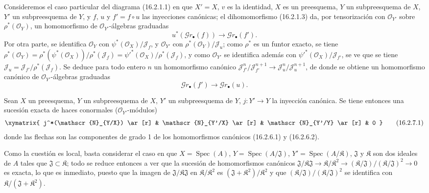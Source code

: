 \begin{env}[16.2.6]
\label{IV.16.2.6}
Consideremos el caso particular del diagrama (16.2.1.1) en que $X'=X$, $v$ es
la identidad, $X$ es un preesquema, $Y$ un subpreesquema de $X$, $Y'$ un
subpreesquema de $Y$, y $f$, $u$ y $f'=f\circ u$ las inyecciones canónicas; el
dihomomorfismo (16.2.1.3) da, por tensorización con
$\mathcal{O}_{Y'}$ sobre $\rho^*(\mathcal{O}_Y)$, un homomorfismo de
$\mathcal{O}_{Y'}$-álgebras graduadas
\[
  u^*(\mathscr{G}r_\bullet(f))
  \longrightarrow\mathscr{G}r_\bullet(f').
  \tag{16.2.6.1}
  \label{IV.16.2.6.1}
\]
Por otra parte, se identifica $\mathcal{O}_Y$ con
$\psi^*(\mathcal{O}_X)/\mathscr{J}_f$, y $\mathcal{O}_{Y'}$ con
$\rho^*(\mathcal{O}_Y)/\mathscr{J}_u$; como $\rho^*$ es un funtor exacto,
se tiene
$\rho^*(\mathcal{O}_Y)=
\rho^*(\psi^*(\mathcal{O}_X))/\rho^*(\mathscr{J}_f)=
\psi'^*(\mathcal{O}_X)/\rho^*(\mathscr{J}_f)$, y como
$\mathcal{O}_{Y'}$ se identifica además con
$\psi'^*(\mathcal{O}_X)/\mathscr{J}_{f'}$, se ve que se tiene
$\mathscr{J}_u=\mathscr{J}_{f'}/\rho^*(\mathscr{J}_f)$. Se deduce para
todo entero $n$ un homomorfismo canónico
$\mathscr{J}_{f'}^n/\mathscr{J}_{f'}^{n+1}\to
\mathscr{J}_u^n/\mathscr{J}_u^{n+1}$, de donde se obtiene un homomorfismo canónico de
$\mathcal{O}_{Y'}$-álgebras graduadas
\[
  \mathscr{G}r_\bullet(f')
  \longrightarrow\mathscr{G}r_\bullet(u).
  \tag{16.2.6.2}
  \label{IV.16.2.6.2}
\]
\end{env}

\begin{proposition}[16.2.7]
\label{IV.16.2.7}
Sean $X$ un preesquema, $Y$ un subpreesquema de $X$, $Y'$ un
subpreesquema de $Y$, $j:Y'\to Y$ la inyección canónica. Se tiene entonces una sucesión
exacta de haces conormales ($\mathcal{O}_{Y'}$-módulos)
\[
  \xymatrix{
    j^*(\mathscr{N}_{Y/X}) \ar[r] &
    \mathscr{N}_{Y'/X} \ar[r] &
    \mathscr{N}_{Y'/Y} \ar[r] & 0
  }
  \tag{16.2.7.1}
  \label{IV.16.2.7.1}
\]
donde las flechas son las componentes de grado 1 de los homomorfismos canónicos
\textup{(16.2.6.1)} y \textup{(16.2.6.2)}.
\end{proposition}

Como la cuestión es local, basta considerar el caso en que
$X=\operatorname{Spec}(A)$, $Y=\operatorname{Spec}(A/\mathfrak{J})$,
$Y'=\operatorname{Spec}(A/\mathfrak{K})$, $\mathfrak{J}$ y $\mathfrak{K}$
son dos ideales de $A$ tales que $\mathfrak{J}\subset\mathfrak{K}$; todo
se reduce entonces a ver
que la sucesión de homomorfismos canónicos
$\mathfrak{J}/\mathfrak{K}\mathfrak{J}\to
\mathfrak{K}/\mathfrak{K}^2\to
(\mathfrak{K}/\mathfrak{J})/(\mathfrak{K}/\mathfrak{J})^2\to 0$
es exacta, lo que es inmediato, puesto que la imagen de
$\mathfrak{J}/\mathfrak{K}\mathfrak{J}$ en
$\mathfrak{K}/\mathfrak{K}^2$ es
$(\mathfrak{J}+\mathfrak{K}^2)/\mathfrak{K}^2$ y que
$(\mathfrak{K}/\mathfrak{J})/(\mathfrak{K}/\mathfrak{J})^2$ se identifica con
$\mathfrak{K}/(\mathfrak{J}+\mathfrak{K}^2)$.

